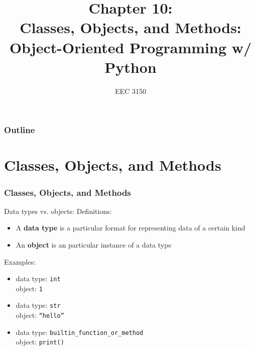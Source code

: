 \documentclass{beamer}
\title{Chapter 10: \\ Classes, Objects, and Methods: \\ Object-Oriented Programming w/ Python}
\author{EEC 3150}
\date{}
\institute{Trevecca Nazarene University}
\newcommand{\code}[1]{\texttt{#1}}
\begin{document}
\frame{\titlepage}
 
\begin{frame}	
	\frametitle{Outline}
	\tableofcontents	
\end{frame}


\section{Classes, Objects, and Methods}

\begin{frame}	
\end{frame}

\begin{frame}	
	\frametitle{Classes, Objects, and Methods}
	
	\begin{block}{Data types vs. objects:}
			Definitions:
			\begin{itemize}
				\item A \textbf{data type} is a particular format for representing data of a certain kind
				\item An \textbf{object} is an particular instance of a data type
			\end{itemize}
		\endminipage\hfill
			Examples:
			\begin{itemize}
				\item data type: \code{int} \\
						object: \code{1}
				\item data type: \code{str} \\
						object: \code{``hello''}
				\item data type: \code{builtin\_function\_or\_method} \\
						object: \code{print()}
			\end{itemize}
		\endminipage\hfill
	\end{block}
	
\end{frame}
\end{document}
